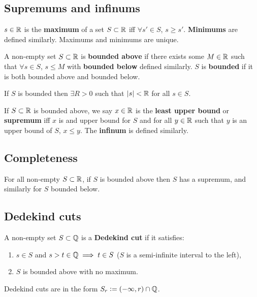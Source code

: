 \documentclass{article}
\begin{document}
\subsection{Supremums and infinums}
\begin{definition}
    $s\in\mathbb{R}$ is the \textbf{maximum} of a set $S\subset\mathbb{R}$ iff $\forall s'\in S$, $s\geq s'$. \textbf{Minimums} are defined similarly. Maximums and minimums are unique.
\end{definition}

\begin{definition}[Bounded]
    A non-empty set $S\subset\mathbb{R}$ is \textbf{bounded above} if there exists some $M\in\mathbb{R}$ such that $\forall s\in S$, $s\leq M$ with \textbf{bounded below} defined similarly. $S$ is \textbf{bounded} if it is both bounded above and bounded below.
\end{definition}

\begin{theorem}
    If $S$ is bounded then $\exists R>0$ such that $|s|<\mathbb{R}$ for all $s\in S$.
\end{theorem}

\begin{definition}
    If $S\subset\mathbb{R}$ is bounded above, we say $x\in\mathbb{R}$ is the \textbf{least upper bound} or \textbf{supremum} iff $x$ is and upper bound for $S$ and for all $y\in\mathbb{R}$ such that $y$ is an upper bound of $S$, $x\leq y$. The \textbf{infinum} is defined similarly.
\end{definition}

\subsection{Completeness}

\begin{theorem}
    For all non-empty $S\subset\mathbb{R}$, if $S$ is bounded above then $S$ has a supremum, and similarly for $S$ bounded below.
\end{theorem}

\subsection{Dedekind cuts}

\begin{definition}
    A non-empty set $S\subset\mathbb{Q}$ is a \textbf{Dedekind cut} if it satisfies: \begin{enumerate}
        \item $s\in S$ and $s>t\in\mathbb{Q} \implies t\in S$ ($S$ is a semi-infinite interval to the left),
        \item $S$ is bounded above with no maximum.
    \end{enumerate} Dedekind cuts are in the form $S_r:=(-\infty,r)\cap\mathbb{Q}$.
\end{definition}
\end{document}

